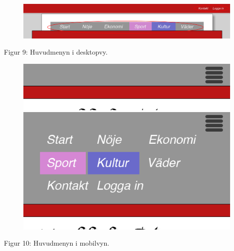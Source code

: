 \documentclass[11pt]{article}
\begin{document}
\begin{figure}[H]
\centerline{%
\includegraphics[scale=0.4]{pics/menydesktop.png}\\
}
\end{figure}
\hspace{0.5cm}Figur 9: Huvudmenyn i desktopvy.

\begin{figure}[H]
\centerline{%
\includegraphics[scale=0.6]{pics/menymobil.png}\hspace{2em}%
\includegraphics[scale=0.35]{pics/menymobilopen.png}%
}
\end{figure}
\hspace{0.5cm}Figur 10: Huvudmenyn i mobilvyn.
\end{document}
